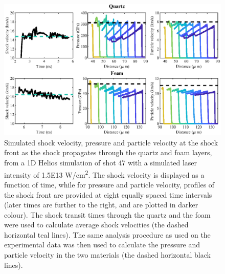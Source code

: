 \begin{figure} [h!]
\begin{centering}
\includegraphics[width=1\textwidth]{figures/Experiment/ShockDecay_wide.eps}%
\caption{\label{fig:ShockDecay} Simulated shock velocity, pressure and particle velocity at the shock front as the shock propagates through the quartz and foam layers, from a 1D Helios simulation of shot 47 with a simulated laser intensity of \num{1.5E13} \si[per-mode=symbol]{W/cm^2}. The shock velocity is displayed as a function of time, while for pressure and particle velocity, profiles of the shock front are provided at eight equally spaced time intervals (later times are further to the right, and are plotted in darker colour). The shock transit times through the quartz and the foam were used to calculate average shock velocities (the dashed horizontal teal lines). The same analysis procedure as used on the experimental data was then used to calculate the pressure and particle velocity in the two materials (the dashed horizontal black lines).}
\end{centering}
\end{figure}

